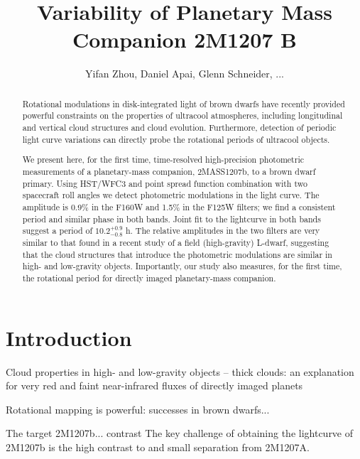 \documentclass[apj]{emulateapj}
\begin{document}
\title{Variability of Planetary Mass Companion 2M1207 B}
\author{Yifan Zhou, Daniel Apai, Glenn Schneider, ...}

\begin{abstract} Rotational modulations in disk-integrated light of
brown dwarfs have recently provided powerful constraints on the
properties of ultracool atmospheres, including longitudinal and
vertical cloud structures and cloud evolution. Furthermore, detection
of periodic light curve variations can directly probe the rotational
periods of ultracool objects.

We present here, for the first time, time-resolved high-precision
photometric measurements of a planetary-mass companion, 2MASS1207b, to
a brown dwarf primary. Using HST/WFC3 and point spread function %
combination with two spacecraft roll angles we detect photometric
modulations in the light curve. The amplitude is 0.9\% in the F160W
and 1.5\% in the F125W filters; we find a consistent period and
similar phase in both bands. Joint fit to the lightcurve in both bands
suggest a period of $10.2^{+0.9}_{-0.8}$ h. The relative amplitudes in the two
filters are very similar to that found in a recent study of a field
(high-gravity) L-dwarf, suggesting that the cloud structures that
introduce the photometric modulations are similar in high- and
low-gravity objects. Importantly, our study also measures, for the
first time, the rotational period for directly imaged planetary-mass
companion.
\end{abstract}

\maketitle
%
\section{Introduction}

Cloud properties in high- and low-gravity objects -- thick clouds: an
explanation for very red and faint near-infrared fluxes of directly
imaged planets

Rotational mapping is powerful: successes in brown dwarfs...

The target 2M1207b... contrast The key challenge of obtaining the
lightcurve of 2M1207b is the high contrast to and small separation
from 2M1207A.
\end{document}
